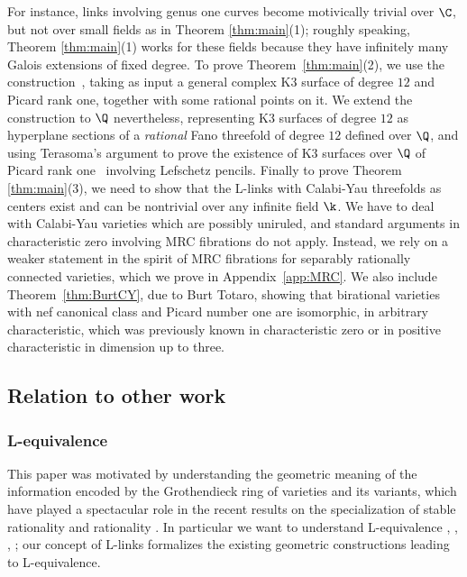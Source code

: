 For instance, links involving genus one curves
become motivically trivial over $\C$,
but not over
small fields as
in Theorem \ref{thm:main}(1);
roughly speaking,
Theorem \ref{thm:main}(1)
works for these fields
because they have infinitely many
Galois extensions of fixed degree.
To prove Theorem~\ref{thm:main}(2),
we use the construction~\cite{HassettLai},
taking as input a general complex
K3 surface of degree $12$ and
Picard rank one,
together with some rational points on it.
We extend the construction to $\Q$ nevertheless,
representing K3 surfaces
of degree $12$
as hyperplane sections of
a \emph{rational} Fano threefold of degree $12$
defined over $\Q$,
and using Terasoma's argument to prove the existence of K3 surfaces
over $\Q$ of Picard rank one~\cite{Terasoma}
involving Lefschetz pencils.
Finally to prove Theorem \ref{thm:main}(3),
we need to show that the L-links with Calabi-Yau threefolds as centers \cite{IMOUG2}
exist and
can be nontrivial
over any infinite field $\k$.
We have to deal with
Calabi-Yau varieties
which are possibly uniruled, and
standard arguments in characteristic zero involving MRC fibrations
do not apply. Instead, we rely on
a weaker statement in the spirit of MRC fibrations
for separably rationally connected varieties,
which we prove in Appendix~\ref{app:MRC}.
We also include
Theorem~\ref{thm:BurtCY},
due to Burt Totaro, showing that
birational
varieties with nef canonical class and
Picard number
one are isomorphic, in arbitrary
characteristic, which was previously
known in characteristic zero or in positive characteristic in dimension up to three.



\subsection{Relation to other work}

\subsubsection{L-equivalence}


This paper was motivated by
understanding the geometric meaning
of the information encoded by the Grothendieck ring of varieties and
its variants,
which have played a spectacular role in the recent
results on the specialization of stable rationality \cite{NicaiseShinder} and rationality \cite{KontsevichTschinkel}.
In particular
we want to understand
L-equivalence \cite{Borisov}, \cite{HassettLai},
\cite{KuznetsovShinder}, \cite{IMOUG2}; our concept of L-links
formalizes the existing geometric constructions leading to L-equivalence.


